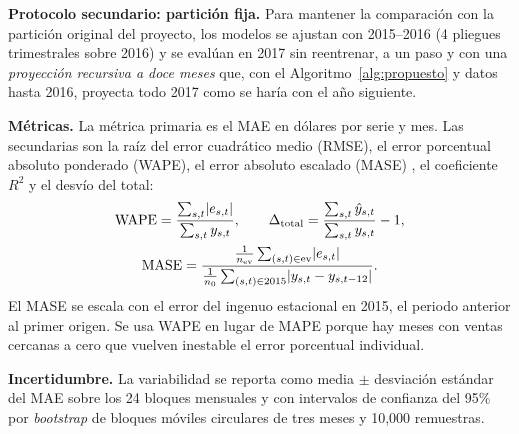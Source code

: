 \documentclass[pdflatex,sn-mathphys-num]{sn-jnl}
\begin{document}
\textbf{Protocolo secundario: partición fija.} Para mantener la comparación con la partición original del proyecto, los modelos se ajustan con 2015--2016 (4 pliegues trimestrales sobre 2016) y se evalúan en 2017 sin reentrenar, a un paso y con una \emph{proyección recursiva a doce meses} que, con el Algoritmo~\ref{alg:propuesto} y datos hasta 2016, proyecta todo 2017 como se haría con el año siguiente.

\textbf{Métricas.} La métrica primaria es el MAE en dólares por serie y mes. Las secundarias son la raíz del error cuadrático medio (RMSE), el error porcentual absoluto ponderado (WAPE), el error absoluto escalado (MASE) \cite{hyndman2006}, el coeficiente $R^2$ y el desvío del total:
\begin{gather}
\mathrm{WAPE}=\frac{\sum_{s,t}\lvert e_{s,t}\rvert}{\sum_{s,t}y_{s,t}},\qquad
\Delta_{\mathrm{total}}=\frac{\sum_{s,t}\hat{y}_{s,t}}{\sum_{s,t}y_{s,t}}-1,\notag\\
\mathrm{MASE}=\frac{\frac{1}{n_{\mathrm{ev}}}\sum_{(s,t)\in\mathrm{ev}}\lvert e_{s,t}\rvert}{\frac{1}{n_0}\sum_{(s,t)\in 2015}\lvert y_{s,t}-y_{s,t-12}\rvert}.
\label{eq:metricas}
\end{gather}
El MASE se escala con el error del ingenuo estacional en 2015, el periodo anterior al primer origen. Se usa WAPE en lugar de MAPE porque hay meses con ventas cercanas a cero que vuelven inestable el error porcentual individual.

\textbf{Incertidumbre.} La variabilidad se reporta como media $\pm$ desviación estándar del MAE sobre los 24 bloques mensuales y con intervalos de confianza del 95\% por \emph{bootstrap} de bloques móviles circulares \cite{kunsch1989} de tres meses y 10{,}000 remuestras.
\end{document}
